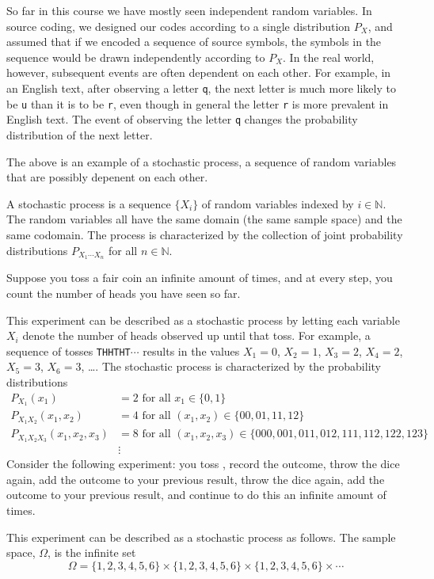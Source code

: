 So far in this course we have mostly seen independent random variables. In source coding, we designed our codes according to a single distribution $P_X$, and assumed that if we encoded a sequence of source symbols, the symbols in the sequence would be drawn independently according to $P_X$. In the real world, however, subsequent events are often dependent on each other. For example, in an English text, after observing a letter \texttt{q}, the next letter is much more likely to be \texttt{u} than it is to be \texttt{r}, even though in general the letter \texttt{r} is more prevalent in English text. The event of observing the letter \texttt{q} changes the probability distribution of the next letter.

The above is an example of a stochastic process, a sequence of random variables that are possibly depenent on each other.

\begin{definition}
A stochastic process is a sequence $\{X_i\}$ of random variables indexed by $i \in \mathbb{N}$. The random variables all have the same domain (the same sample space) and the same codomain. The process is characterized by the collection of joint probability distributions $P_{X_1 \cdots X_n}$ for all $n \in \mathbb{N}$.
\end{definition}

\begin{example}
Suppose you toss a fair coin an infinite amount of times, and at every step, you count the number of heads you have seen so far.

This experiment can be described as a stochastic process by letting each variable $X_i$ denote the number of heads observed up until that toss. For example, a sequence of tosses \texttt{THHTHT}$\cdots$ results in the values $X_1 = 0$, $X_2 = 1$, $X_3 = 2$, $X_4 = 2$, $X_5 = 3$, $X_6 = 3$, \dots . The stochastic process is characterized by the probability distributions
\begin{align*}
P_{X_1}(x_1) &= 2 \text{ for all } x_1 \in \{0,1\}\\
P_{X_1X_2}(x_1,x_2) &= 4 \text{ for all } (x_1,x_2) \in \{00,01,11,12\}\\
P_{X_1X_2X_3}(x_1,x_2,x_3) &= 8 \text{ for all } (x_1,x_2,x_3) \in \{000, 001, 011, 012, 111, 112, 122, 123\}\\
&\vdots
\end{align*}
Consider the following experiment: you toss , record the outcome, throw the dice again, add the outcome to your previous result, throw the dice again, add the outcome to your previous result, and continue to do this an infinite amount of times.

This experiment can be described as a stochastic process as follows. The sample space, $\Omega$, is the infinite set
\[
\Omega = \{1, 2,3,4,5,6\} \times \{1,2,3,4,5,6\} \times \{1,2,3,4,5,6\} \times \cdots
\]

\end{example}

